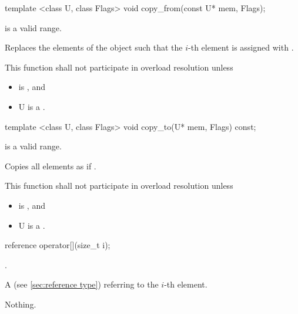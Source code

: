 \begin{itemdecl}
template <class U, class Flags> void copy_from(const U* mem, Flags);
\end{itemdecl}
\begin{itemdescr}
  \code{[mem, mem + size())} is a valid range.

  \pnum\effects Replaces the elements of the \simd object such that the $i$-th element is assigned with  \foralli.

  \pnum\remarks This function shall not participate in overload resolution unless
  \begin{itemize}
      \item {} is \true, and
      \item \type U is a \realArithmeticType.
  \end{itemize}
\end{itemdescr}

\begin{itemdecl}
template <class U, class Flags> void copy_to(U* mem, Flags) const;
\end{itemdecl}
\begin{itemdescr}
  \code{[mem, mem + size())} is a valid range.

  \pnum\effects Copies all \simd elements as if  \foralli.

  \pnum\remarks This function shall not participate in overload resolution unless
  \begin{itemize}
      \item {} is \true, and
      \item \type U is a \realArithmeticType.
  \end{itemize}
\end{itemdescr}

\newcommand\simdElementReference[1]{
  \pnum\requires \code{i < size()}.

  \pnum\returns A \code{reference} (see \ref{sec:reference type}) referring to the $i$-th element.
%

  \pnum\throws Nothing.
}
\begin{itemdecl}
reference operator[](size_t i);
\end{itemdecl}
\begin{itemdescr}
  \simdElementReference{\simd{}}
\end{itemdescr}

